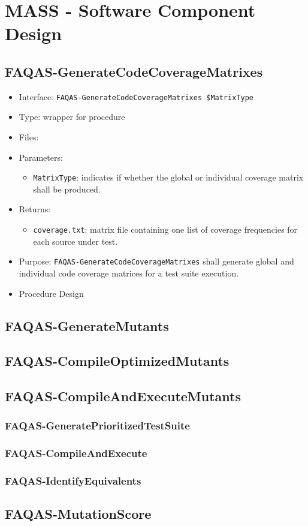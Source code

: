 
\section{MASS - Software Component Design}


\subsection{FAQAS-GenerateCodeCoverageMatrixes}

\begin{itemize}
	\item Interface: \texttt{FAQAS-GenerateCodeCoverageMatrixes \$MatrixType}
	\item Type: wrapper for procedure
	\item Files: 
	\item Parameters: 
	\begin{itemize}
		\item \texttt{MatrixType}: indicates if whether the global or individual coverage matrix shall be produced.
	\end{itemize} 
	\item Returns:
	\begin{itemize}
		\item \texttt{coverage.txt}: matrix file containing one list of coverage frequencies for each source under test.
	\end{itemize}
	\item Purpose: \texttt{FAQAS-GenerateCodeCoverageMatrixes} shall generate global and individual code coverage matrices for a test suite execution.
	\item Procedure Design
\end{itemize}

\subsection{FAQAS-GenerateMutants}

\subsection{FAQAS-CompileOptimizedMutants}

\subsection{FAQAS-CompileAndExecuteMutants}

\subsubsection{FAQAS-GeneratePrioritizedTestSuite}

\subsubsection{FAQAS-CompileAndExecute}

\subsubsection{FAQAS-IdentifyEquivalents}

\subsection{FAQAS-MutationScore}


